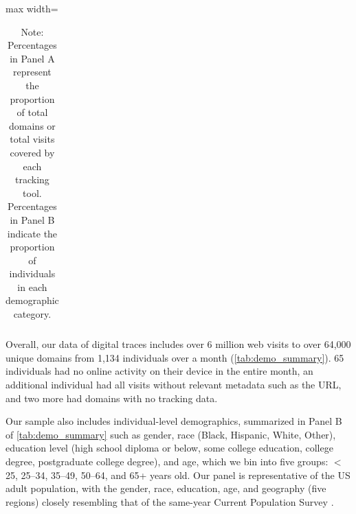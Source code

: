 \documentclass[12pt, letterpaper]{article}
\begin{document}
\begin{table}[ht]
\begin{adjustbox}{max width=\textwidth}
\begin{tabular}{@{\hspace{0\tabcolsep}}lrc@{\hspace{0\tabcolsep}}}
   \bottomrule
\end{tabular}
\end{adjustbox}
\caption*{\footnotesize Note:
    Percentages in Panel A represent the proportion of total domains or total visits covered by each tracking tool.
    Percentages in Panel B indicate the proportion of individuals in each demographic category.
}
\end{table}



Overall, our data of digital traces includes over 6 million web visits to over 64,000 unique domains from 1,134 individuals over a month (\cref{tab:demo_summary}). 65 individuals had no online activity on their device in the entire month, an additional individual had all visits without relevant metadata such as the URL, and two more had domains with no tracking data.

Our sample also includes individual-level demographics, summarized in Panel B of \cref{tab:demo_summary} such as gender, race (Black, Hispanic, White, Other), education level (high school diploma or below, some college education, college degree, postgraduate college degree), and age, which we bin into five groups: $<$ 25, 25--34, 35--49, 50--64, and 65+ years old. Our panel is representative of the US adult population, with the gender, race, education, age, and geography (five regions) closely resembling that of the same-year Current Population Survey \citep{bad_domains}.
\end{document}
